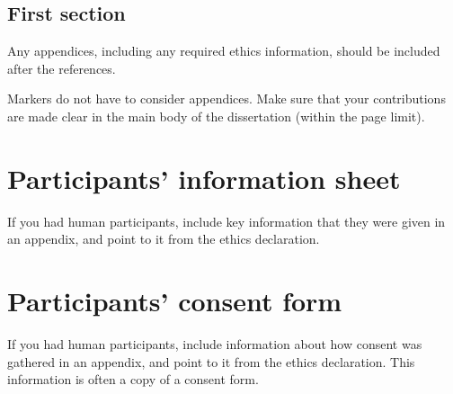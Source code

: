 \documentclass[logo,bsc,singlespacing,parskip]{infthesis}
\begin{document}
\section{First section}

Any appendices, including any required ethics information, should be included
after the references.

Markers do not have to consider appendices. Make sure that your contributions
are made clear in the main body of the dissertation (within the page limit).

\chapter{Participants' information sheet}

If you had human participants, include key information that they were given in
an appendix, and point to it from the ethics declaration.

\chapter{Participants' consent form}

If you had human participants, include information about how consent was
gathered in an appendix, and point to it from the ethics declaration.
This information is often a copy of a consent form.
\end{document}
